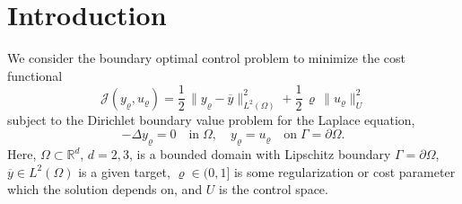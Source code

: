 \documentclass{article}
\numberwithin{equation}{section}
\begin{document}
\section{Introduction}\label{Sec:Introduction}
We consider the boundary optimal control problem to minimize the cost
functional
\begin{equation}\label{Eqn:Functional abstract}
  {\mathcal{J}}(y_\varrho,u_\varrho) =
  \frac{1}{2} \, \| y_\varrho - \overline{y} \|^2_{L^2(\Omega)} +
  \frac{1}{2} \, \varrho \, \| u_\varrho \|^2_U
\end{equation}
subject to the Dirichlet boundary value problem for the Laplace equation,
\begin{equation}\label{Eqn:Laplace DBVP}
  - \Delta y_\varrho = 0 \quad \mbox{in} \; \Omega, \quad
  y_\varrho = u_\varrho \quad \mbox{on} \; \Gamma = \partial \Omega .
\end{equation}
Here, $\Omega \subset {\mathbb{R}}^d$, $d=2,3$, is a bounded domain with
Lipschitz boundary $\Gamma = \partial \Omega$,
$\overline{y} \in L^2(\Omega)$ is a given target, $\varrho \in (0,1]$ is
some regularization or cost parameter which the solution depends on, and
$U$ is the control space.
\end{document}
